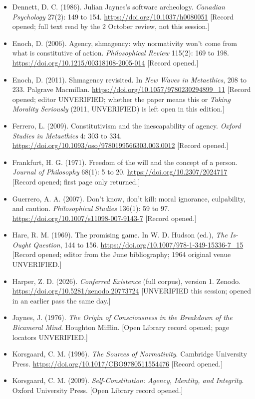 \documentclass[11pt]{article}
\begin{document}
\begin{itemize}
\item Dennett, D. C. (1986). Julian Jaynes's software archeology. \emph{Canadian Psychology} 27(2): 149 to 154. \url{https://doi.org/10.1037/h0080051} [Record opened; full text read by the 2 October review, not this session.]
\item Enoch, D. (2006). Agency, shmagency: why normativity won't come from what is constitutive of action. \emph{Philosophical Review} 115(2): 169 to 198. \url{https://doi.org/10.1215/00318108-2005-014} [Record opened.]
\item Enoch, D. (2011). Shmagency revisited. In \emph{New Waves in Metaethics}, 208 to 233. Palgrave Macmillan. \url{https://doi.org/10.1057/9780230294899_11} [Record opened; editor UNVERIFIED; whether the paper means this or \emph{Taking Morality Seriously} (2011, UNVERIFIED) is left open in this edition.]
\item Ferrero, L. (2009). Constitutivism and the inescapability of agency. \emph{Oxford Studies in Metaethics} 4: 303 to 334. \url{https://doi.org/10.1093/oso/9780199566303.003.0012} [Record opened.]
\item Frankfurt, H. G. (1971). Freedom of the will and the concept of a person. \emph{Journal of Philosophy} 68(1): 5 to 20. \url{https://doi.org/10.2307/2024717} [Record opened; first page only returned.]
\item Guerrero, A. A. (2007). Don't know, don't kill: moral ignorance, culpability, and caution. \emph{Philosophical Studies} 136(1): 59 to 97. \url{https://doi.org/10.1007/s11098-007-9143-7} [Record opened.]
\item Hare, R. M. (1969). The promising game. In W. D. Hudson (ed.), \emph{The Is-Ought Question}, 144 to 156. \url{https://doi.org/10.1007/978-1-349-15336-7_15} [Record opened; editor from the June bibliography; 1964 original venue UNVERIFIED.]
\item Harper, Z. D. (2026). \emph{Conferred Existence} (full corpus), version 1. Zenodo. \url{https://doi.org/10.5281/zenodo.20773724} [UNVERIFIED this session; opened in an earlier pass the same day.]
\item Jaynes, J. (1976). \emph{The Origin of Consciousness in the Breakdown of the Bicameral Mind}. Houghton Mifflin. [Open Library record opened; page locators UNVERIFIED.]
\item Korsgaard, C. M. (1996). \emph{The Sources of Normativity}. Cambridge University Press. \url{https://doi.org/10.1017/CBO9780511554476} [Record opened.]
\item Korsgaard, C. M. (2009). \emph{Self-Constitution: Agency, Identity, and Integrity}. Oxford University Press. [Open Library record opened.]

\end{itemize}
\end{document}
